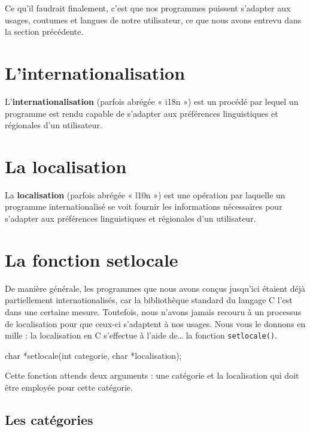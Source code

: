 \documentclass[]{article}
\newenvironment{Shaded}{}{}
\newcommand{\DataTypeTok}[1]{\textcolor[rgb]{0.56,0.13,0.00}{{#1}}}
\newcommand{\NormalTok}[1]{{#1}}
\begin{document}
Ce qu'il faudrait finalement, c'est que nos programmes puissent
s'adapter aux usages, coutumes et langues de notre utilisateur, ce que
nous avons entrevu dans la section précédente.

\section{L'internationalisation}\label{linternationalisation}

L'\textbf{internationalisation} (parfois abrégée « i18n ») est un
procédé par lequel un programme est rendu capable de s'adapter aux
préférences linguistiques et régionales d'un utilisateur.

\section{La localisation}\label{la-localisation}

La \textbf{localisation} (parfois abrégée « l10n ») est une opération
par laquelle un programme internationalisé se voit fournir les
informations nécessaires pour s'adapter aux préférences linguistiques et
régionales d'un utilisateur.

\section{La fonction setlocale}\label{la-fonction-setlocale}

De manière générale, les programmes que nous avons conçus jusqu'ici
étaient déjà partiellement internationalisés, car la bibliothèque
standard du langage C l'est dans une certaine mesure. Toutefois, nous
n'avons jamais recouru à un processus de localisation pour que ceux-ci
s'adaptent à nos usages. Nous vous le donnons en mille : la localisation
en C s'effectue à l'aide de\ldots{} la fonction \texttt{setlocale()}.

\begin{Shaded}
\begin{Highlighting}[]
\DataTypeTok{char} \NormalTok{*setlocale(}\DataTypeTok{int} \NormalTok{categorie, }\DataTypeTok{char} \NormalTok{*localisation);}
\end{Highlighting}
\end{Shaded}

Cette fonction attends deux arguments : une catégorie et la localisation
qui doit être employée pour cette catégorie.

\subsection{Les catégories}\label{les-catuxe9gories}
\end{document}
